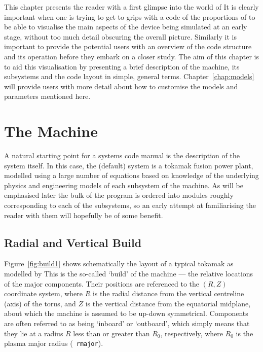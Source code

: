 \label{chap:overview}

This chapter presents the reader with a first glimpse into the world of \PSD
It is clearly important when one is trying to get to grips with a code of the
proportions of \PS to be able to visualise the main aspects of the device
being simulated at an early stage, without too much detail obscuring the
overall picture. Similarly it is important to provide the potential users with
an overview of the code structure and its operation before they embark on a
closer study. The aim of this chapter is to aid this visualisation by
presenting a brief description of the machine, its subsystems and the code
layout in simple, general terms. Chapter~\ref{chap:models} will provide users
with more detail about how to customise the models and parameters mentioned
here.

\section{The Machine}

A natural starting point for a systems code manual is the description of the
system itself. In this case, the (default) system is a tokamak fusion power
plant, modelled using a large number of equations based on knowledge of the
underlying physics and engineering models of each subsystem of the machine. As
will be emphasised later the bulk of the program is ordered into modules
roughly corresponding to each of the subsystems, so an early attempt at
familiarising the reader with them will hopefully be of some benefit.

\subsection{Radial and Vertical Build}
Figure~\ref{fig:build1} shows schematically the layout of a typical tokamak as
modelled by \PSD This is the so-called `build' of the machine --- the relative
locations of the major components. Their positions are referenced to the
$(R,Z)$ coordinate system, where $R$ is the radial distance from the vertical
centreline (axis) of the torus, and $Z$ is the vertical distance from the
equatorial midplane, about which the machine is assumed to be up-down
symmetrical. Components are often referred to as being `inboard' or
`outboard', which simply means that they lie at a radius $R$ less than or
greater than $R_0$, respectively, where $R_0$ is the plasma major radius ({\tt
rmajor}).

